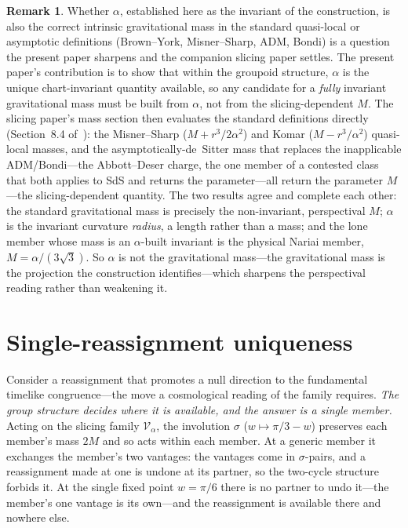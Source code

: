 \documentclass[11pt,a4paper]{article}
\theoremstyle{definition}
\newtheorem{remark}[theorem]{Remark}
\begin{document}
\begin{remark}\label{rem:mass-question}
Whether $\alpha$, established here as the invariant of the construction, is also the correct intrinsic gravitational mass in the standard quasi-local or asymptotic definitions (Brown--York, Misner--Sharp, ADM, Bondi) is a question the present paper sharpens and the companion slicing paper settles. The present paper's contribution is to show that within the groupoid structure, $\alpha$ is the unique chart-invariant quantity available, so any candidate for a \emph{fully} invariant gravitational mass must be built from $\alpha$, not from the slicing-dependent $M$. The slicing paper's mass section then evaluates the standard definitions directly (Section~8.4 of~\cite{JanzenSlicing}): the Misner--Sharp ($M+r^{3}/2\alpha^{2}$) and Komar ($M-r^{3}/\alpha^{2}$) quasi-local masses, and the asymptotically-de~Sitter mass that replaces the inapplicable ADM/Bondi---the Abbott--Deser charge, the one member of a contested class that both applies to SdS and returns the parameter---all return the parameter $M$---the slicing-dependent quantity. The two results agree and complete each other: the standard gravitational mass is precisely the non-invariant, perspectival $M$; $\alpha$ is the invariant curvature \emph{radius}, a length rather than a mass; and the lone member whose mass is an $\alpha$-built invariant is the physical Nariai member, $M=\alpha/(3\sqrt3)$. So $\alpha$ is not the gravitational mass---the gravitational mass is the projection the construction identifies---which sharpens the perspectival reading rather than weakening it.
\end{remark}

\section{Single-reassignment uniqueness}\label{sec:single-reassignment}

Consider a reassignment that promotes a null direction to the fundamental timelike congruence---the move a cosmological reading of the family requires. \emph{The group structure decides where it is available, and the answer is a single member.} Acting on the slicing family $\mathcal{V}_{\alpha}$, the involution $\sigma$ ($w\mapsto\pi/3-w$) preserves each member's mass $2M$ and so acts within each member. At a generic member it exchanges the member's two vantages: the vantages come in $\sigma$-pairs, and a reassignment made at one is undone at its partner, so the two-cycle structure forbids it. At the single fixed point $w=\pi/6$ there is no partner to undo it---the member's one vantage is its own---and the reassignment is available there and nowhere else.
\end{document}
